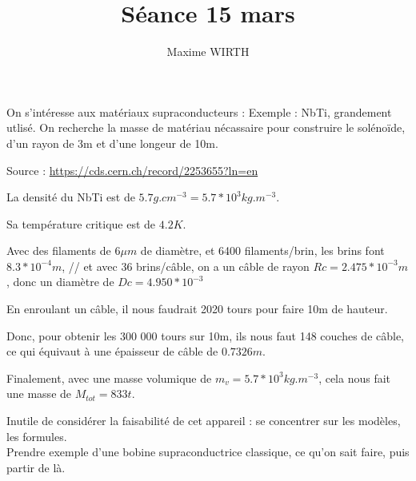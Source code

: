 \documentclass{article}
\author{Maxime WIRTH}
\title{Séance 15 mars}
\begin{document}
\maketitle

On s'intéresse aux matériaux supraconducteurs :
Exemple : NbTi, grandement utlisé.
On recherche la masse de matériau nécassaire pour construire le solénoïde, d'un rayon de 3m et d'une longeur de 10m.

Source : \url{https://cds.cern.ch/record/2253655?ln=en}

La densité du NbTi est de $5.7 g.cm^{-3} = 5.7*10^3 kg.m^{-3}$.

Sa température critique est de $4.2K$.

Avec des filaments de $6 {\mu}m$ de diamètre, et 6400 filaments/brin, les brins font $8.3 * 10^{-4} m$, //
et  avec 36 brins/câble, on a un câble de rayon $Rc = 2.475*10^{-3} m$, donc un diamètre de $Dc = 4.950*10^{-3}$

En enroulant un câble, il nous faudrait 2020 tours pour faire 10m de hauteur.

Donc, pour obtenir les 300 000 tours sur 10m, ils nous faut 148 couches de câble, ce qui équivaut à une épaisseur de câble de
$0.7326 m$.

Finalement, avec une masse volumique de $m_v = 5.7*10^3 kg.m^{-3}$, cela nous fait une masse de $M_{tot} = 833t$.

Inutile de considérer la faisabilité de cet appareil : se concentrer sur les modèles, les formules.\\
Prendre exemple d'une bobine supraconductrice classique, ce qu'on sait faire, puis partir de là.
\end{document}

